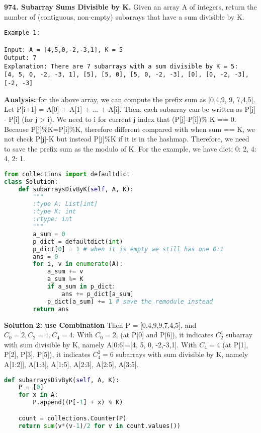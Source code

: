 \documentclass[../main.tex]{subfiles}
\begin{document}
\begin{examples}[resume]
\item \textbf{974. Subarray Sums Divisible by K.} Given an array A of integers, return the number of (contiguous, non-empty) subarrays that have a sum divisible by K.
\begin{lstlisting}[numbers=none]
Example 1:

Input: A = [4,5,0,-2,-3,1], K = 5
Output: 7
Explanation: There are 7 subarrays with a sum divisible by K = 5:
[4, 5, 0, -2, -3, 1], [5], [5, 0], [5, 0, -2, -3], [0], [0, -2, -3], [-2, -3]
\end{lstlisting}

\textbf{Analysis:} for the above array, we can compute the prefix sum as [0,4,9, 9, 7,4,5]. Let P[i+1] = A[0] + A[1] + ... + A[i]. Then, each subarray can be written as P[j] - P[i] (for j > i). We need to i for current j index that (P[j]-P[i])\% K == 0. Because P[j]\%K=P[i]\%K, therefore different compared with when sum == K, we not check P[j]-K but instead P[j]\%K if it is in the hashmap. Therefore, we need to save the prefix sum as the modulo of K. For the example, we have dict: {0: 2, 4: 4, 2: 1}.
\begin{lstlisting}[language=Python]
from collections import defaultdict
class Solution:
    def subarraysDivByK(self, A, K):
        """
        :type A: List[int]
        :type K: int
        :rtype: int
        """
        a_sum = 0
        p_dict = defaultdict(int)
        p_dict[0] = 1 # when it is empty we still has one 0:1 
        ans = 0
        for i, v in enumerate(A):
            a_sum += v
            a_sum %= K
            if a_sum in p_dict:
                ans += p_dict[a_sum]
            p_dict[a_sum] += 1 # save the remodule instead
        return ans
\end{lstlisting}
\textbf{Solution 2: use Combination}  Then P = [0,4,9,9,7,4,5], and $C_0 = 2, C_2 = 1, C_4 = 4$. With $C_0=2$,  (at P[0] and P[6]), it indicates $C_2^1$ subarray with sum divisible by K, namely A[0:6]=[4, 5, 0, -2,-3,1]. With $C_4 = 4$ (at P[1], P[2], P[3], P[5]), it indicates $C_4^2=6$ subarrays with sum divisible by K, namely A[1:2]], A[1:3], A[1:5], A[2:3], A[2:5], A[3:5].
\begin{lstlisting}[language=Python]
def subarraysDivByK(self, A, K):
    P = [0]
    for x in A:
        P.append((P[-1] + x) % K)

    count = collections.Counter(P)
    return sum(v*(v-1)/2 for v in count.values())
\end{lstlisting}

\end{examples}
\end{document}
